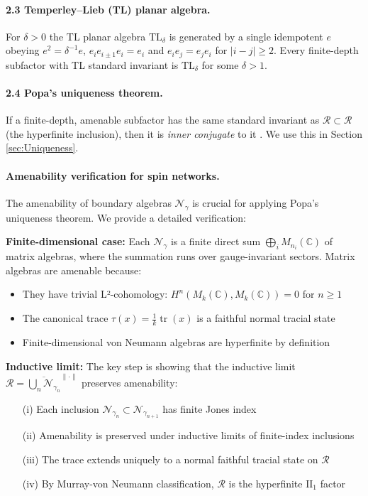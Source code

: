 \documentclass[11pt]{article}
\begin{document}
\paragraph{2.3  Temperley–Lieb (TL) planar algebra.}
For $\delta>0$ the TL planar algebra $\mathrm{TL}_\delta$ is generated by
a single idempotent $e$ obeying
$e^{2}=\delta^{-1}e$,
$e_ie_{i\pm1}e_i=e_i$ and $e_ie_j=e_je_i$ for $|i-j|\ge2$.
Every finite-depth subfactor with TL standard invariant is
$\mathrm{TL}_\delta$ for some $\delta>1$.

\paragraph{2.4  Popa’s uniqueness theorem.}
If a finite-depth, amenable subfactor has the same standard invariant as
$\mathcal R\subset\mathcal R$ (the hyperfinite inclusion), then it is
\emph{inner conjugate} to it \cite[Thm.~4.5]{PopaCBMS}.  We use this in
Section \ref{sec:Uniqueness}.

\paragraph{Amenability verification for spin networks.}
The amenability of boundary algebras $\mathcal{N}_\gamma$ is crucial for applying
Popa's uniqueness theorem. We provide a detailed verification:

\textbf{Finite-dimensional case:} Each $\mathcal{N}_\gamma$ is a finite direct sum
$\bigoplus_i M_{n_i}(\mathbb{C})$ of matrix algebras, where the summation runs over
gauge-invariant sectors. Matrix algebras are amenable because:
\begin{itemize}
  \item They have trivial L²-cohomology: $H^n(M_k(\mathbb{C}), M_k(\mathbb{C})) = 0$ for $n \geq 1$
  \item The canonical trace $\tau(x) = \frac{1}{k}\operatorname{tr}(x)$ is a faithful normal tracial state
  \item Finite-dimensional von Neumann algebras are hyperfinite by definition
\end{itemize}

\textbf{Inductive limit:} The key step is showing that the inductive limit
$\mathcal{R} = \overline{\bigcup_n \mathcal{N}_{\gamma_n}}^{\|\cdot\|}$ preserves amenability:
\begin{itemize}
  \item[(i)] Each inclusion $\mathcal{N}_{\gamma_n} \subset \mathcal{N}_{\gamma_{n+1}}$ has finite Jones index
  \item[(ii)] Amenability is preserved under inductive limits of finite-index inclusions \cite[Thm.~6.1.4]{PitPolBook}
  \item[(iii)] The trace extends uniquely to a normal faithful tracial state on $\mathcal{R}$
  \item[(iv)] By Murray-von Neumann classification, $\mathcal{R}$ is the hyperfinite $\text{II}_1$ factor
\end{itemize}
\end{document}
